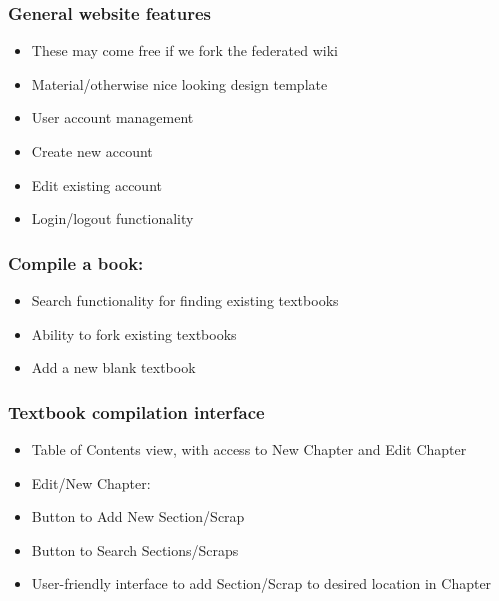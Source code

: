 \documentclass[letterpaper, 10pt, draftclsnofoot, onecolumn]{IEEEtran}
\begin{document}
{{{

\subsubsection[System feature 1: [ General Website Features
{]}]{\rmfamily\bfseries\color{black} General website features
}
\begin{itemize}
\item These may come free if we fork the federated wiki
\item Material/otherwise nice looking design template
\item User account management
\item Create new account
\item Edit existing account
\item Login/logout functionality
\end{itemize}

\subsubsection[System feature 2: [ Compile a book
{]}]{\rmfamily\bfseries\color{black} Compile a book:
}
\begin{itemize}
\item Search functionality for finding existing textbooks
\item Ability to fork existing textbooks
\item Add a new blank textbook
\end{itemize}

\subsubsection[System feature 3: [ Textbook Compilation Interface
{]}]{\rmfamily\bfseries\color{black} Textbook compilation interface
}
\begin{itemize}
\item Table of Contents view, with access to New Chapter and Edit Chapter
\item Edit/New Chapter:
\item Button to Add New Section/Scrap
\item Button to Search Sections/Scraps
\item User-friendly interface to add Section/Scrap to desired location in Chapter
\end{itemize}

}}}
\end{document}

